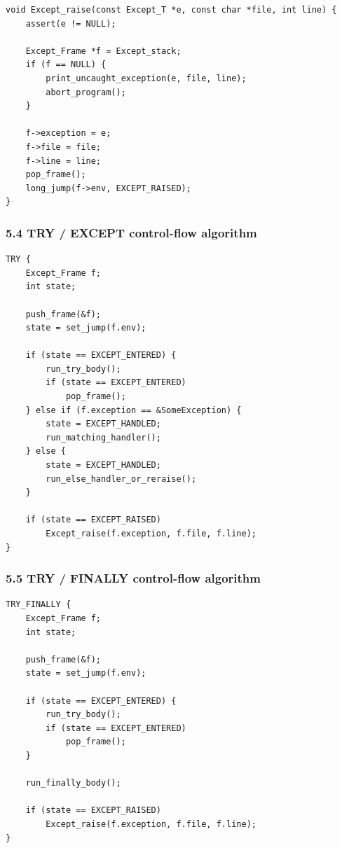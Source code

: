 \documentclass[11pt]{article}
\begin{document}
\begin{verbatim}
void Except_raise(const Except_T *e, const char *file, int line) {
    assert(e != NULL);

    Except_Frame *f = Except_stack;
    if (f == NULL) {
        print_uncaught_exception(e, file, line);
        abort_program();
    }

    f->exception = e;
    f->file = file;
    f->line = line;
    pop_frame();
    long_jump(f->env, EXCEPT_RAISED);
}
\end{verbatim}

\subsubsection{5.4 TRY / EXCEPT control-flow algorithm}\label{try-except-control-flow-algorithm}

\begin{verbatim}
TRY {
    Except_Frame f;
    int state;

    push_frame(&f);
    state = set_jump(f.env);

    if (state == EXCEPT_ENTERED) {
        run_try_body();
        if (state == EXCEPT_ENTERED)
            pop_frame();
    } else if (f.exception == &SomeException) {
        state = EXCEPT_HANDLED;
        run_matching_handler();
    } else {
        state = EXCEPT_HANDLED;
        run_else_handler_or_reraise();
    }

    if (state == EXCEPT_RAISED)
        Except_raise(f.exception, f.file, f.line);
}
\end{verbatim}

\subsubsection{5.5 TRY / FINALLY control-flow algorithm}\label{try-finally-control-flow-algorithm}

\begin{verbatim}
TRY_FINALLY {
    Except_Frame f;
    int state;

    push_frame(&f);
    state = set_jump(f.env);

    if (state == EXCEPT_ENTERED) {
        run_try_body();
        if (state == EXCEPT_ENTERED)
            pop_frame();
    }

    run_finally_body();

    if (state == EXCEPT_RAISED)
        Except_raise(f.exception, f.file, f.line);
}
\end{verbatim}
\end{document}
